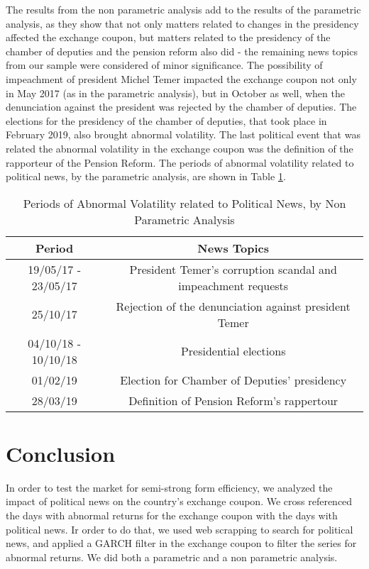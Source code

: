 \documentclass[a4paper]{article}
\begin{document}
The results from the non parametric analysis add to the results of the parametric analysis, as they show that not only matters related to changes in the presidency affected the exchange coupon, but matters related to the presidency of the chamber of deputies and the pension reform also did - the remaining news topics from our sample were considered of minor significance. The possibility of impeachment of president Michel Temer impacted the exchange coupon not only in May 2017 (as in the parametric analysis), but in October as well, when the denunciation against the president was rejected by the chamber of deputies. The elections for the presidency of the chamber of deputies, that took place in February 2019, also brought abnormal volatility. The last political event that was related the abnormal volatility in the exchange coupon was the definition of the rapporteur of the Pension Reform. The periods of abnormal volatility related to political news, by the parametric analysis, are shown in Table \ref{tab:resnon}.

\begin{table}[H]
\caption{Periods of Abnormal Volatility related to Political News, by Non Parametric Analysis}
\label{tab:resnon}
\centering
\begin{tabular}{| c | c |}
\hline
Period & News Topics \\
\hline \hline
19/05/17 - 23/05/17 & President Temer's corruption scandal and impeachment requests \\
\hline
25/10/17 & Rejection of the denunciation against president Temer \\
\hline
04/10/18 - 10/10/18 & Presidential elections \\
\hline
01/02/19 & Election for Chamber of Deputies' presidency \\
\hline
28/03/19 & Definition of Pension Reform's rappertour \\
\hline
\end{tabular}
\end{table}

\section{Conclusion}

In order to test the market for semi-strong form efficiency, we analyzed the impact of political news on the country's exchange coupon. We cross referenced the days with abnormal returns for the exchange coupon with the days with political news. Ir order to do that, we used web scrapping to search for political news, and applied a GARCH filter in the exchange coupon to filter the series for abnormal returns. We did both a parametric and a non parametric analysis.
\end{document}
